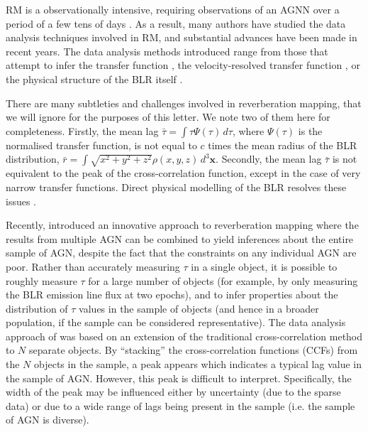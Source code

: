 \documentclass[useAMS,usenatbib]{mn2e}
\begin{document}
RM is a observationally intensive, requiring observations of an AGNN
over a period of
a few tens of days \citep{2013ApJ...769..128B}. As a result, many authors have
studied the data analysis techniques involved in RM, and substantial
advances have been made in recent years.
The data analysis methods introduced range from those that attempt to infer the
transfer function \citep[the distribution of lags in a single object,
e.g.][]{1995ApJ...440..166K, 2011ApJ...735...80Z},
the velocity-resolved transfer function
\citep{2010ApJ...720L..46B}, or the physical structure of the BLR itself
\citep{pancoast, arp151, pancoast2, 2013arXiv1310.3907L}.

There are many subtleties and challenges involved in reverberation mapping,
that we will ignore
for the purposes of this letter. We note two of them here for completeness. Firstly,
the mean lag $\bar{\tau} = \int \tau\Psi(\tau)\, d\tau$, where $\Psi(\tau)$
is the normalised transfer function, is not equal to $c$ times the mean radius of the BLR
distribution, $\bar{r} = \int \sqrt{x^2+y^2+z^2}\rho(x, y, z)\, d^3 \mathbf{x}$.
Secondly, the mean lag $\bar{\tau}$ is not equivalent to the peak of the
cross-correlation function, except in the case of very narrow
transfer functions. Direct physical modelling of the BLR resolves these
issues \citep{pancoast, arp151, 2013arXiv1310.3907L}.

Recently, \citet{2012MNRAS.427.2701F, 2013MNRAS.434L..16F} introduced an
innovative approach to reverberation mapping where the results from multiple
AGN can be combined to yield inferences about the entire sample of AGN,
despite the fact that the constraints on any individual AGN are poor. Rather
than accurately measuring $\tau$ in a single object, it is possible to roughly
measure $\tau$ for a large number of objects (for example, by only measuring
the BLR emission line flux at two epochs), and to infer properties about
the distribution of $\tau$ values in the sample of objects (and hence in
a broader population, if the sample can be considered representative).
The data analysis approach of \citet{2012MNRAS.427.2701F} was based on an
extension of the traditional cross-correlation method to $N$ separate objects.
By ``stacking'' the cross-correlation functions (CCFs) from the $N$ objects in
the sample, a peak appears which indicates a typical lag value in the sample
of AGN. However, this peak is difficult to interpret. Specifically, the width
of the peak may be influenced either by uncertainty (due to the sparse data)
or due to a wide range of lags being present in the sample (i.e. the sample of
AGN is diverse).
\end{document}
